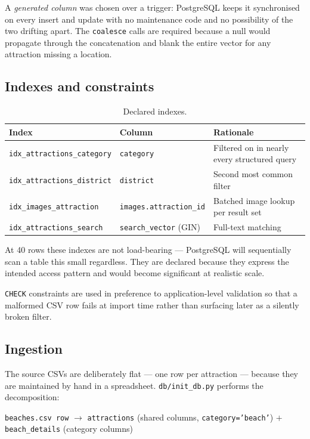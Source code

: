 \documentclass[11pt,a4paper]{article}
\begin{document}
A \emph{generated column} was chosen over a trigger: PostgreSQL keeps it
synchronised on every insert and update with no maintenance code and no
possibility of the two drifting apart. The \texttt{coalesce} calls are required
because a null would propagate through the concatenation and blank the entire
vector for any attraction missing a location.

\subsection{Indexes and constraints}

\begin{table}[h]
\centering
\small
\begin{tabular}{lll}
\toprule
\textbf{Index} & \textbf{Column} & \textbf{Rationale} \\
\midrule
\texttt{idx\_attractions\_category} & \texttt{category} & Filtered on in nearly every structured query \\
\texttt{idx\_attractions\_district} & \texttt{district} & Second most common filter \\
\texttt{idx\_images\_attraction}    & \texttt{images.attraction\_id} & Batched image lookup per result set \\
\texttt{idx\_attractions\_search}   & \texttt{search\_vector} (GIN) & Full-text matching \\
\bottomrule
\end{tabular}
\caption{Declared indexes.}
\end{table}

At 40 rows these indexes are not load-bearing --- PostgreSQL will sequentially
scan a table this small regardless. They are declared because they express the
intended access pattern and would become significant at realistic scale.

\texttt{CHECK} constraints are used in preference to application-level
validation so that a malformed CSV row fails at import time rather than
surfacing later as a silently broken filter.

\subsection{Ingestion}

The source CSVs are deliberately flat --- one row per attraction --- because
they are maintained by hand in a spreadsheet. \texttt{db/init\_db.py} performs
the decomposition:

\begin{center}
\small
\texttt{beaches.csv row} $\longrightarrow$
\texttt{attractions} (shared columns, \texttt{category='beach'}) $+$
\texttt{beach\_details} (category columns)
\end{center}
\end{document}
